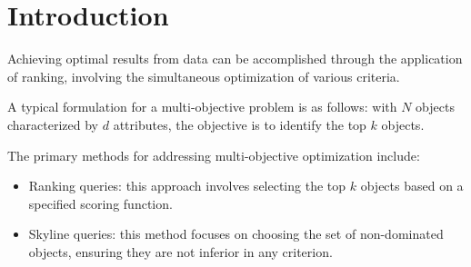 \section{Introduction}

Achieving optimal results from data can be accomplished through the application of ranking, involving the simultaneous optimization of various criteria.

A typical formulation for a multi-objective problem is as follows: with $N$ objects characterized by $d$ attributes, the objective is to identify the top $k$ objects.

The primary methods for addressing multi-objective optimization include:
\begin{itemize}
    \item Ranking queries: this approach involves selecting the top $k$ objects based on a specified scoring function.
    \item Skyline queries: this method focuses on choosing the set of non-dominated objects, ensuring they are not inferior in any criterion.
\end{itemize}